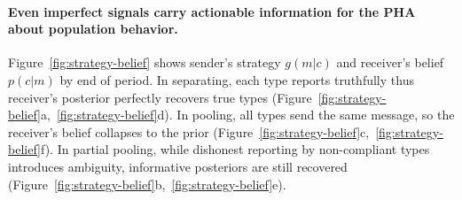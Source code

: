 \documentclass[sigconf,review]{acmart}
\begin{document}
\paragraph{Even imperfect signals carry actionable information for the PHA about population behavior. }
Figure~\ref{fig:strategy-belief} shows sender’s strategy $g(m|c)$ and receiver’s belief $p(c|m)$ by end of period. In separating, each type reports truthfully thus receiver’s posterior perfectly recovers true types (Figure~\ref{fig:strategy-belief}a,~\ref{fig:strategy-belief}d). In pooling, all types send the same message, so the receiver’s belief collapses to the prior (Figure~\ref{fig:strategy-belief}c,~\ref{fig:strategy-belief}f). In partial pooling, while dishonest reporting by non-compliant types introduces ambiguity, informative posteriors are still recovered (Figure~\ref{fig:strategy-belief}b,~\ref{fig:strategy-belief}e). 



    
    
\end{document}
